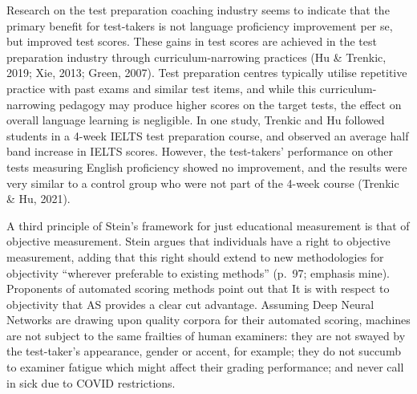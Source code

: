 \documentclass[
]{book}
\begin{document}
Research on the test preparation coaching industry seems to indicate that the primary benefit for test-takers is not language proficiency improvement per se, but improved test scores. These gains in test scores are achieved in the test preparation industry through curriculum-narrowing practices (Hu \& Trenkic, 2019; Xie, 2013; Green, 2007). Test preparation centres typically utilise repetitive practice with past exams and similar test items, and while this curriculum-narrowing pedagogy may produce higher scores on the target tests, the effect on overall language learning is negligible. In one study, Trenkic and Hu followed students in a 4-week IELTS test preparation course, and observed an average half band increase in IELTS scores. However, the test-takers' performance on other tests measuring English proficiency showed no improvement, and the results were very similar to a control group who were not part of the 4-week course (Trenkic \& Hu, 2021).

A third principle of Stein's framework for just educational measurement is that of objective measurement. Stein argues that individuals have a right to objective measurement, adding that this right should extend to new methodologies for objectivity ``wherever preferable to existing methods'' (p.~97; emphasis mine). Proponents of automated scoring methods point out that It is with respect to objectivity that AS provides a clear cut advantage. Assuming Deep Neural Networks are drawing upon quality corpora for their automated scoring, machines are not subject to the same frailties of human examiners: they are not swayed by the test-taker's appearance, gender or accent, for example; they do not succumb to examiner fatigue which might affect their grading performance; and never call in sick due to COVID restrictions.
\end{document}
